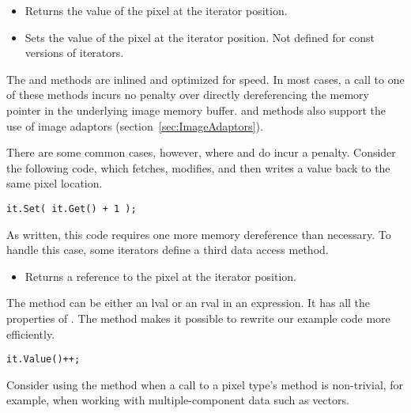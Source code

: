 \begin{itemize}
\item \textbf{} Returns the value of the pixel at the
iterator position.

\item \textbf{} Sets the value of the pixel at the
iterator position.  Not defined for const versions of iterators.
\end{itemize}

The  and  methods are inlined and optimized for speed. In
most cases, a call to one of these methods incurs no penalty over directly
dereferencing the memory pointer in the underlying image memory buffer.
 and  methods also support the use of image adaptors
(section~\ref{sec:ImageAdaptors}).

There are some common cases, however, where  and  do incur a
penalty. Consider the following code, which fetches, modifies, and then writes
a value back to the same pixel location.

\small
\begin{verbatim}
it.Set( it.Get() + 1 );
\end{verbatim}
\normalsize

As written, this code requires one more memory dereference than necessary.  To
handle this case, some iterators define a third data access method.

\begin{itemize}
\item \textbf{} Returns a reference to the pixel at
the iterator position.
\end{itemize}

The  method can be either an lval or an rval in an expression.  It
has all the properties of .  The  method makes it
possible to rewrite our example code more efficiently.

\small
\begin{verbatim}
it.Value()++;
\end{verbatim}
\normalsize

Consider using the  method when a call to a pixel type's
 method is non-trivial, for example, when working
with multiple-component data such as vectors.

